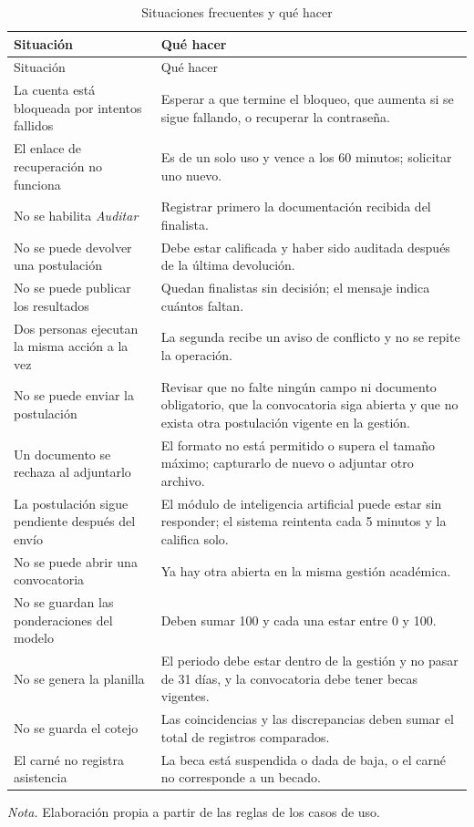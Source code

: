 \begin{longtable}{>{\raggedright\arraybackslash}p{5.2cm} >{\raggedright\arraybackslash}p{7.6cm}}
\caption{Situaciones frecuentes y qué hacer}\label{tab:problemas_frecuentes}\\
\toprule
Situación & Qué hacer \\
\midrule
\endfirsthead
\toprule
Situación & Qué hacer \\
\midrule
\endhead
\bottomrule
\endfoot
La cuenta está bloqueada por intentos fallidos & Esperar a que termine el bloqueo, que aumenta si se sigue fallando, o recuperar la contraseña. \\
El enlace de recuperación no funciona & Es de un solo uso y vence a los 60 minutos; solicitar uno nuevo. \\
No se habilita \textit{Auditar} & Registrar primero la documentación recibida del finalista. \\
No se puede devolver una postulación & Debe estar calificada y haber sido auditada después de la última devolución. \\
No se puede publicar los resultados & Quedan finalistas sin decisión; el mensaje indica cuántos faltan. \\
Dos personas ejecutan la misma acción a la vez & La segunda recibe un aviso de conflicto y no se repite la operación. \\
No se puede enviar la postulación & Revisar que no falte ningún campo ni documento obligatorio, que la convocatoria siga abierta y que no exista otra postulación vigente en la gestión. \\
Un documento se rechaza al adjuntarlo & El formato no está permitido o supera el tamaño máximo; capturarlo de nuevo o adjuntar otro archivo. \\
La postulación sigue pendiente después del envío & El módulo de inteligencia artificial puede estar sin responder; el sistema reintenta cada 5 minutos y la califica solo. \\
No se puede abrir una convocatoria & Ya hay otra abierta en la misma gestión académica. \\
No se guardan las ponderaciones del modelo & Deben sumar 100 y cada una estar entre 0 y 100. \\
No se genera la planilla & El periodo debe estar dentro de la gestión y no pasar de 31 días, y la convocatoria debe tener becas vigentes. \\
No se guarda el cotejo & Las coincidencias y las discrepancias deben sumar el total de registros comparados. \\
El carné no registra asistencia & La beca está suspendida o dada de baja, o el carné no corresponde a un becado. \\
\end{longtable}
\noindent\textit{Nota.} Elaboración propia a partir de las reglas de los casos de uso.

